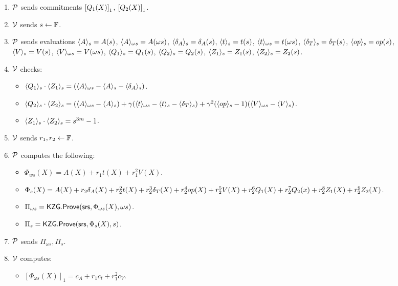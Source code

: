 \begin{figure}[htbp]
\begin{mdframed}
{\begin{enumerate}[leftmargin=1em, label=\arabic*]
            \item $\prover$ sends commitments $\gone{Q_1(X)}$, $\gone{Q_2(X)}$.
            \item $\verifier$ sends $s\gets\F$.
            \item $\prover$ sends evaluations $\val{s}{A}=A(s)$, $\val{\omega s}{A}=A(\omega s)$, $\val{s}{\delta_A} = \delta_A(s)$, $\val{s}{t}=t(s)$, $\val{\omega s}{t}=t(\omega s)$, $\val{s}{\delta_T} = \delta_T(s)$, $\val{s}{\op}=\op(s)$, $\val{s}{V}=V(s)$, $\val{\omega s}{V}=V(\omega s)$, $\val{s}{Q_1}=Q_1(s)$, $\val{s}{Q_2}=Q_2(s)$, $\val{s}{Z_1}=Z_1(s)$, $\val{s}{Z_2}=Z_2(s)$.
            \item $\verifier$ checks:
            \begin{itemize}[label=-]
                \item $\val{s}{Q_1}\cdot \val{s}{Z_1} = (\val{\omega s}{A} - \val{s}{A} - \val{s}{\delta_A})$.
                \item  $\val{s}{Q_2}\cdot \val{s}{Z_2} = (\val{\omega s}{A} - \val{s}{A})+\gamma (\val{\omega s}{t} - \val{s}{t} - \val{s}{\delta_T})+\gamma^2 (\val{s}{\op}-1)(\val{\omega s}{V} - \val{s}{V}) $.
                \item $\val{s}{Z_1} \cdot \val{s}{Z_2}=s^{3m}-1$.
            \end{itemize}
            \item $\verifier$ sends $r_1, r_2\gets\F$.
            \item $\prover$ computes the following:
            \begin{itemize}[label=-]
                \item $\Phi_{ws}(X)= A(X)+r_1 t(X) +r_1^2 V(X)$.
                \item $\Phi_s(X)=A(X)+r_2 \delta_A(X)+r_2^2 t(X)+ r_2^3 \delta_T(X)+r_2^4 \op(X) +r_2^5 V(X)+r_2^6 Q_1(X)+ r_2^7 Q_2(x)+r_2^8 Z_1(X)+r_2^9 Z_2(X)$.
                \item $\Pi_{\omega s} = \KZGopen(\srs, \Phi_{\omega s}(X), \omega s)$.
                \item $\Pi_{s} = \KZGopen(\srs, \Phi_{s}(X),s)$.
            \end{itemize}
            \item $\prover$ sends $\Pi_{\omega s}, \Pi_{s}$.
            \item $\verifier$ computes:
            \begin{itemize}[label=-]
                \item $[\Phi_{\omega s}(X)]_1= c_A +r_1 c_t + r_1^2 c_V$.

\end{itemize}
\end{enumerate}}
\end{mdframed}
\end{figure}
